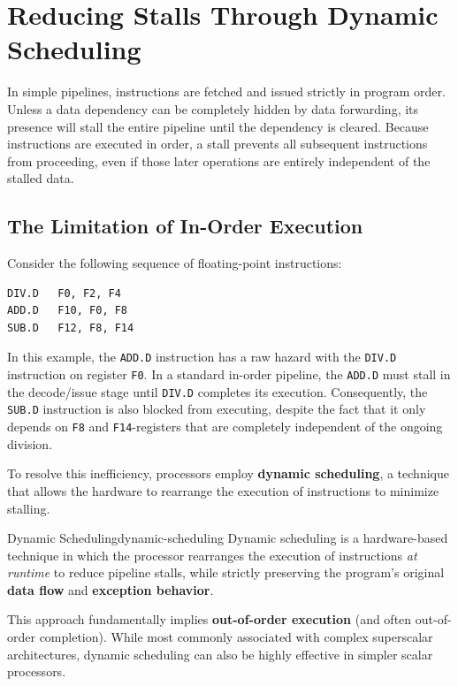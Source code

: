 \chapter{Reducing Stalls Through Dynamic Scheduling}
\label{ch:dynamic_scheduling}

In simple pipelines, instructions are fetched and issued strictly in program order. Unless a data dependency can be completely hidden by data forwarding, its presence will stall the entire pipeline until the dependency is cleared. Because instructions are executed in order, a stall prevents all subsequent instructions from proceeding, even if those later operations are entirely independent of the stalled data.

\section{The Limitation of In-Order Execution}
Consider the following sequence of floating-point instructions:
\begin{lstlisting}[language={[x86masm]Assembler}]
DIV.D   F0, F2, F4
ADD.D   F10, F0, F8
SUB.D   F12, F8, F14
\end{lstlisting}

In this example, the \texttt{ADD.D} instruction has a \gls{raw} hazard with the \texttt{DIV.D} instruction on register \texttt{F0}. In a standard in-order pipeline, the \texttt{ADD.D} must stall in the decode/issue stage until \texttt{DIV.D} completes its execution. Consequently, the \texttt{SUB.D} instruction is also blocked from executing, despite the fact that it only depends on \texttt{F8} and \texttt{F14}-registers that are completely independent of the ongoing division.

To resolve this inefficiency, processors employ \textbf{dynamic scheduling}, a technique that allows the hardware to rearrange the execution of instructions to minimize stalling.

\begin{definition}{Dynamic Scheduling}{dynamic-scheduling}
    Dynamic scheduling is a hardware-based technique in which the processor rearranges the execution of instructions \textit{at runtime} to reduce pipeline stalls, while strictly preserving the program's original \textbf{data flow} and \textbf{exception behavior}.
\end{definition}

This approach fundamentally implies \textbf{out-of-order execution} (and often out-of-order completion). While most commonly associated with complex superscalar architectures, dynamic scheduling can also be highly effective in simpler scalar processors.

